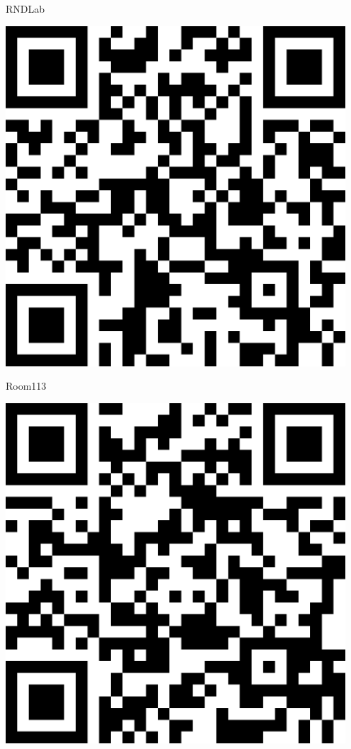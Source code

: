 \documentclass[letterpaper]{article}
\begin{document}
 \hfill{\small RNDLab} 

 \vspace{1in} 
 \pagebreak 
{} 
 \vspace*{\fill} 
 \begingroup 
 \centerline{\includegraphics[scale=1,width=5in,height=5in]{Room113.png}} 
 \endgroup 
 \vspace*{\fill} 

 \hfill{\small Room113} 

 \vspace{1in} 
 \pagebreak 
{} 
 \vspace*{\fill} 
 \begingroup 
 \centerline{\includegraphics[scale=1,width=5in,height=5in]{Room3430.png}} 
 \endgroup 
 \vspace*{\fill} 
\end{document}
